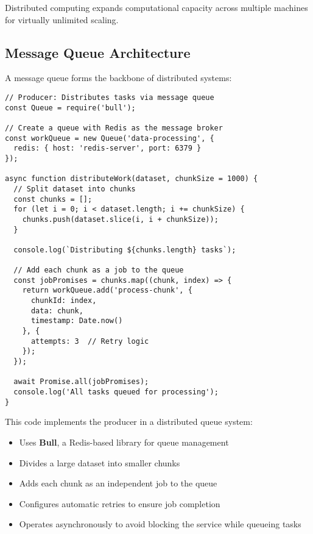 \documentclass[12pt,letterpaper]{article}
\newenvironment{macterminal}{%
    \begin{mdframed}[
        linecolor=terminalFrame,
        backgroundcolor=terminalBg,
        roundcorner=5pt,
        skipabove=5pt,
        skipbelow=5pt,
        linewidth=1pt,
        innertopmargin=5pt,
        frametitle={%
            \tikz[baseline=(current bounding box.east), outer sep=0pt]{
                \fill[red!80!black] (0,0) circle (5pt);
                \fill[yellow!80!black] (0.7,0) circle (5pt);
                \fill[green!70!black] (1.4,0) circle (5pt);
            }
        },
        frametitlealignment=\raggedright,
        frametitleaboveskip=8pt,
        frametitlebelowskip=0pt,
    ]
}{%
    \end{mdframed}%
}
\begin{document}
Distributed computing expands computational capacity across multiple machines for virtually unlimited scaling.

\subsection{Message Queue Architecture}

A message queue forms the backbone of distributed systems:

\begin{macterminal}
\begin{lstlisting}
// Producer: Distributes tasks via message queue
const Queue = require('bull');

// Create a queue with Redis as the message broker
const workQueue = new Queue('data-processing', {
  redis: { host: 'redis-server', port: 6379 }
});

async function distributeWork(dataset, chunkSize = 1000) {
  // Split dataset into chunks
  const chunks = [];
  for (let i = 0; i < dataset.length; i += chunkSize) {
    chunks.push(dataset.slice(i, i + chunkSize));
  }
  
  console.log(`Distributing ${chunks.length} tasks`);
  
  // Add each chunk as a job to the queue
  const jobPromises = chunks.map((chunk, index) => {
    return workQueue.add('process-chunk', {
      chunkId: index,
      data: chunk,
      timestamp: Date.now()
    }, {
      attempts: 3  // Retry logic
    });
  });
  
  await Promise.all(jobPromises);
  console.log('All tasks queued for processing');
}
\end{lstlisting}
\end{macterminal}

This code implements the producer in a distributed queue system:
\begin{itemize}
    \item Uses \textbf{\textcolor{accentColor}{Bull}}, a Redis-based library for queue management
    \item Divides a large dataset into smaller chunks
    \item Adds each chunk as an independent job to the queue
    \item Configures automatic retries to ensure job completion
    \item Operates asynchronously to avoid blocking the service while queueing tasks
\end{itemize}
\end{document}
